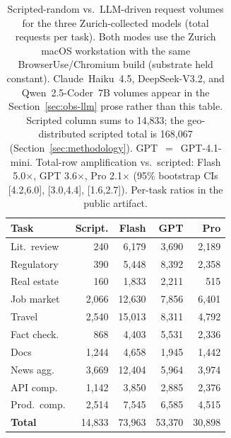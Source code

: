 \documentclass[10pt,sigconf,letterpaper,anonymous,nonacm]{acmart}
\begin{document}
\begin{table}[t]
\centering
\small
\caption{Scripted-random vs.\ LLM-driven request volumes for the three
  Zurich-collected models (total requests per task).  Both modes use
  the Zurich macOS workstation with the same BrowserUse/Chromium build
  (substrate held constant).  Claude~Haiku~4.5, DeepSeek-V3.2, and
  Qwen~2.5-Coder~7B volumes appear in the Section~\ref{sec:obs-llm}
  prose rather than this table.  Scripted column sums to 14{,}833;
  the geo-distributed scripted total is 168{,}067
  (Section~\ref{sec:methodology}).  GPT~$=$~GPT-4.1-mini.
  Total-row amplification vs.\ scripted: Flash 5.0$\times$, GPT
  3.6$\times$, Pro 2.1$\times$ (95\% bootstrap CIs [4.2,6.0],
  [3.0,4.4], [1.6,2.7]).  Per-task ratios in the public artifact.}
\label{tab:llm}
\setlength{\tabcolsep}{4pt}
\begin{tabular}{@{}lrrrr@{}}
\toprule
\textbf{Task} & \textbf{Script.} & \textbf{Flash} & \textbf{GPT} & \textbf{Pro} \\
\midrule
Lit.\ review   &    240 &  6{,}179 &  3{,}690 & 2{,}189 \\
Regulatory     &    390 &  5{,}448 &  8{,}392 & 2{,}358 \\
Real estate    &    160 &  1{,}833 &  2{,}211 &   515 \\
Job market     &  2{,}066 & 12{,}630 &  7{,}856 & 6{,}401 \\
Travel         &  2{,}540 & 15{,}013 &  8{,}311 & 4{,}792 \\
Fact check.    &    868 &  4{,}403 &  5{,}531 & 2{,}336 \\
Docs           &  1{,}244 &  4{,}658 &  1{,}945 & 1{,}442 \\
News agg.      &  3{,}669 & 12{,}404 &  5{,}964 & 3{,}974 \\
API comp.      &  1{,}142 &  3{,}850 &  2{,}885 & 2{,}376 \\
Prod.\ comp.   &  2{,}514 &  7{,}545 &  6{,}585 & 4{,}515 \\
\midrule
\textbf{Total} & 14{,}833 & 73{,}963 & 53{,}370 & 30{,}898 \\
\bottomrule
\end{tabular}
\end{table}
\end{document}
